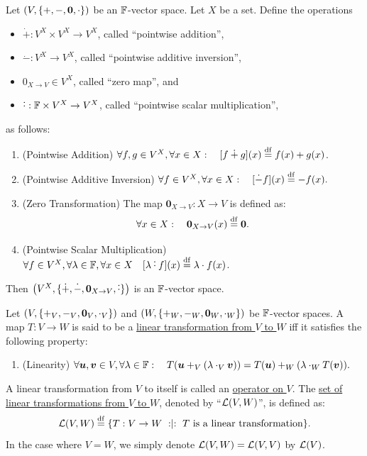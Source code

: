 \documentclass[11pt,reqno]{amsart}
\newcommand{\pwplus}{\mathbin{\dot{+}}}
\newcommand{\pwminus}{\mathbin{\dot{-}}}
\newcommand{\pwcdot}{\mathbin{\dot{\cdot}}}
\begin{document}
\begin{Thm}
\label{def:pointwise-ops}
Let $(V,\set{+,-,\bm0,\cdot})$ be an $\mathbb{F}$-vector space.
Let $X$ be a set.
Define the operations
\begin{itemize}
\item $\pwplus:V^X\times V^X\to V^X$, called ``pointwise addition'',
\item $\pwminus:V^X\to V^X$, called ``pointwise additive inversion'',
\item $0_{X\to V}\in V^X$, called ``zero map'', and
\item $\pwcdot:\F\times V^X\to V^X$,
called ``pointwise scalar multiplication'',
\end{itemize}
as follows:
\begin{enumerate}
\item (Pointwise Addition)
$\forall f,g\in V^X,\forall x\in X:\quad
\FUNC{f\pwplus g}{x}\df f(x)+g(x)
$.
\item (Pointwise Additive Inversion)
$\forall f\in V^X,\forall x\in X:\quad
\FUNC{\pwminus f}{x}\df -f(x).
$
\item (Zero Transformation)
The map $\bm0_{X\to V}:X\to V$ is defined as:
\[\forall x\in X:\quad\bm0_{X\to V}(x)\stackrel{\mathrm{df}}{=}\bm 0.\]
\item (Pointwise Scalar Multiplication)
$\forall f\in V^X,\forall\lambda\in\F,\forall x\in X\quad
\FUNC{\lambda\pwcdot f}{x}\df\lambda\cdot f(x)
$.
\end{enumerate}
Then $\Br{V^X,\set{\pwplus,\pwminus,\bm0_{X\to V},\pwcdot}}$ is an $\mathbb{F}$-vector space.
\end{Thm}

\begin{Def}
Let
$\Br{V,\set{+_V,-_V,\bm0_V,\cdot_V}}$ and $\Br{W,\set{+_W,-_W,\bm0_W,\cdot_W}}$
be $\mathbb{F}$-vector spaces.
A map $T:V\to W$ is said to be a
\ul{linear transformation from $V$ to $W$} iff it satisfies the
following property:
\begin{enumerate}
\item (Linearity)
$
\forall\bm u,\bm v\in V,\forall\lambda\in\mathbb{F}:\quad
T(\bm u+_V(\lambda\cdot_V\bm v))
=T(\bm u)+_W(\lambda\cdot_WT(\bm v)).
$
\end{enumerate}
A linear transformation from $V$ to itself is called an
\ul{operator on $V$}.
The \ul{set of linear transformations from $V$ to $W$},
denoted by ``$\mathcal{L}(V,W)$'', is defined as:
\[\L(V,W)\df\set{T:V\to W\st T~\text{is a linear transformation}}.\]
In the case where $V=W$, we simply denote $\mathcal{L}(V,W)=\mathcal{L}(V,V)$ by $\mathcal{L}(V)$.
\end{Def}
\end{document}
